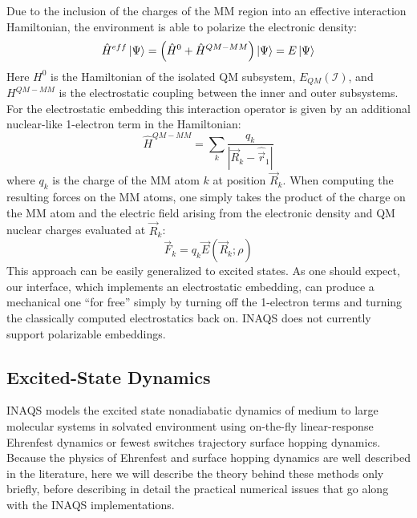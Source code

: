 \documentclass[journal=jctcce,manuscript=article,layout=traditional]{achemso}
\newcommand{\mc}[1]{\ensuremath{\mathcal{#1}}}
\begin{document}
Due to the inclusion of the charges of the MM region into an effective interaction Hamiltonian, the environment is able to polarize the electronic density:
\begin{equation}
    \hat{H}^{eff}\ket{\Psi} = \left(\hat{H}^0 + \hat{H}^{QM-MM}\right) \ket{\Psi} = E\ket{\Psi}
\end{equation}
Here $H^0$ is the Hamiltonian of the isolated QM subsystem, $E_{QM}(\mc{I})$, and $H^{QM-MM}$ is the electrostatic coupling between the inner and outer subsystems.
For the electrostatic embedding this interaction operator is given by an additional nuclear-like 1-electron term in the Hamiltonian:
\begin{equation}
    \hat{H}^{QM-MM} = \sum_k \frac{q_k}{\left| \vec{R}_k-\hat{\vec{r}}_1 \right|}
\end{equation}
where $q_k$ is the charge of the MM atom $k$ at position $\vec{R}_k$. %
%
When computing the resulting forces on the MM atoms, one simply takes the product of the charge on the MM atom and the electric field arising from the electronic density and QM nuclear charges evaluated at $\vec{R}_k$:
\begin{equation}
    \vec{F}_k{} =  q_k\vec{E}(\vec{R}_k; \rho)
\end{equation}
This approach can be easily generalized to excited states. As one should expect, our interface, which implements an electrostatic embedding, can produce a mechanical one ``for free'' simply by turning off the 1-electron terms and turning the classically computed electrostatics back on.
%
%
%
%
%
%
%
INAQS does not currently support polarizable embeddings. 

%
%
%

\subsection{Excited-State Dynamics}\label{sec:theory:dynamics}
INAQS models the excited state nonadiabatic dynamics of medium to large molecular systems in solvated environment using on-the-fly linear-response Ehrenfest dynamics or fewest switches trajectory surface hopping\cite{tully1990JCP} dynamics. 
Because the physics of Ehrenfest\cite{doltsinis:2002:review} and surface hopping\cite{truhlar:review:surfacehop} dynamics are well described in the literature, here we will describe the theory behind these methods only briefly, before describing in detail the practical numerical issues that go along with the INAQS implementations.
\end{document}
